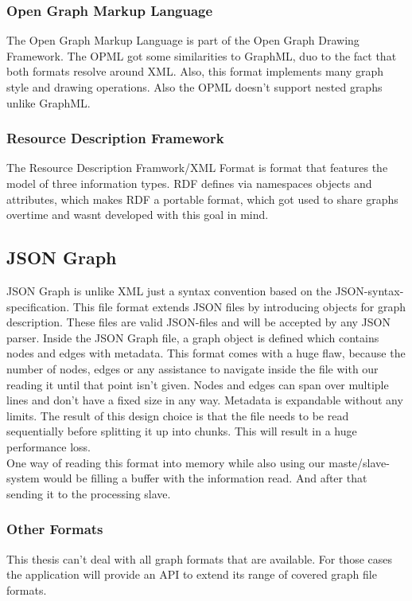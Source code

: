 \subsubsection{Open Graph Markup Language}
The Open Graph Markup Language is part of the Open Graph Drawing Framework. The OPML got some similarities to GraphML, duo to the fact that both formats resolve around XML. Also, this format implements many graph style and drawing operations. Also the OPML doesn’t support nested graphs unlike GraphML.\cite{opengraph.format}

\subsubsection{Resource Description Framework}
The Resource Description Framwork/XML Format is format that features the model of three information types. RDF defines via namespaces objects and attributes, which makes RDF a portable format, which got used to share graphs overtime and wasnt developed with this goal in mind.\cite{miller1998introduction,Lassila98resourcedescription}

\subsection{JSON Graph}
JSON Graph is unlike XML just a syntax convention based on the JSON-syntax-specification. This file format extends JSON files by introducing objects for graph description. These files are valid JSON-files and will be accepted by any JSON parser. Inside the JSON Graph file, a graph object is defined which contains nodes and edges with metadata. 
This format comes with a huge flaw, because the number of nodes, edges or any assistance to navigate inside the file with our reading it until that point isn’t given. Nodes and edges can span over multiple lines and don’t have a fixed size in any way. Metadata is expandable without any limits. The result of this design choice is that the file needs to be read sequentially before splitting it up into chunks. This will result in a huge performance loss.\\
One way of reading this format into memory while also using our maste/slave-system would be filling a buffer with the information read. And after that sending it to the processing slave.\cite{json.format,Roughan.10.03.2015}

\subsubsection{Other Formats}
This thesis can't deal with all graph formats that are available. For those cases the application will provide an API to extend its range of covered graph file formats.